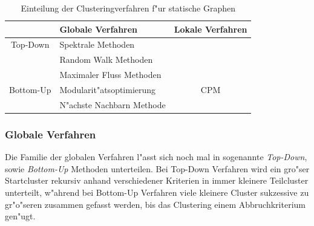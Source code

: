 \documentclass[journal]{vgtc}
\begin{document}
  
    \begin{table}[h]
    \caption{\label{tab:static_methods} Einteilung der Clusteringverfahren f"ur statische Graphen}
    \scriptsize
    \begin{center}
      \begin{tabular}{c|l|c}
	& Globale Verfahren & Lokale Verfahren\\
	\hline
	Top-Down  & Spektrale Methoden       & \\
	          & Random Walk Methoden     & \\
	          & Maximaler Fluss Methoden & \\
	\hline
	Bottom-Up & Modularit"atsoptimierung & CPM \\
	          & N"achste Nachbarn Methode & 
      \end{tabular}
    \end{center}
  \end{table}
  
  \subsubsection*{Globale Verfahren}
  Die Familie der globalen Verfahren l"asst sich noch mal in sogenannte \emph{Top-Down}, sowie
  \emph{Bottom-Up} Methoden \cite{Schaeffer} unterteilen. Bei Top-Down Verfahren wird ein gro"ser Startcluster rekursiv anhand
  verschiedener Kriterien in immer kleinere Teilcluster unterteilt, w"ahrend bei Bottom-Up Verfahren
  viele kleinere Cluster sukzessive zu gr"o"seren zusammen gefasst werden, bis das Clustering einem
  Abbruchkriterium gen"ugt.
  
\end{document}
